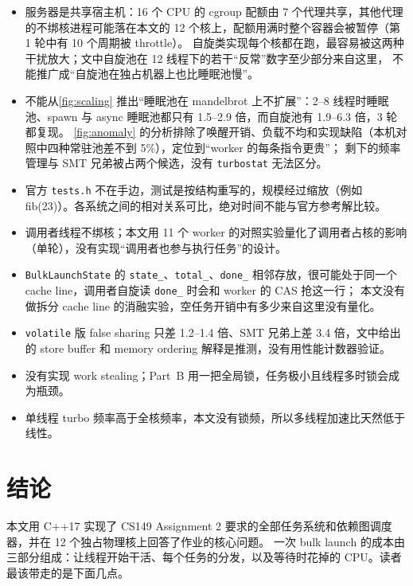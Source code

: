 \documentclass[11pt,a4paper]{ctexart}
\begin{document}
\begin{caveatbox}
\begin{itemize}
\item 服务器是共享宿主机：16 个 CPU 的 cgroup 配额由 7 个代理共享，其他代理的不绑核进程可能落在本文的 12 个核上，配额用满时整个容器会被暂停（第 1 轮中有 10 个周期被 throttle）。
自旋类实现每个核都在跑，最容易被这两种干扰放大；文中自旋池在 12 线程下的若干``反常''数字至少部分来自这里，
不能推广成``自旋池在独占机器上也比睡眠池慢''。
\item 不能从\cref{fig:scaling} 推出``睡眠池在 mandelbrot 上不扩展''：2--8 线程时睡眠池、spawn 与 async 睡眠池都只有 1.5--2.9 倍，而自旋池有 1.9--6.3 倍，3 轮都复现。
\cref{fig:anomaly} 的分析排除了唤醒开销、负载不均和实现缺陷（本机对照中四种常驻池差不到 5\%），定位到``worker 的每条指令更贵''；
剩下的频率管理与 SMT 兄弟被占两个候选，没有 \texttt{turbostat} 无法区分。
\item 官方 \texttt{tests.h} 不在手边，测试是按结构重写的，规模经过缩放（例如 fib(23)）。各系统之间的相对关系可比，绝对时间不能与官方参考解比较。
\item 调用者线程不绑核；本文用 11 个 worker 的对照实验量化了调用者占核的影响（单轮），没有实现``调用者也参与执行任务''的设计。
\item \texttt{BulkLaunchState} 的 \texttt{state\_\allowbreak{}}、\texttt{total\_\allowbreak{}}、\texttt{done\_\allowbreak{}} 相邻存放，很可能处于同一个 cache line，调用者自旋读 \texttt{done\_\allowbreak{}} 时会和 worker 的 CAS 抢这一行；
本文没有做拆分 cache line 的消融实验，空任务开销中有多少来自这里没有量化。
\item \texttt{volatile} 版 false sharing 只差 1.2--1.4 倍、SMT 兄弟上差 3.4 倍，文中给出的 store buffer 和 memory ordering 解释是推测，没有用性能计数器验证。
\item 没有实现 work stealing；Part~B 用一把全局锁，任务极小且线程多时锁会成为瓶颈。
\item 单线程 turbo 频率高于全核频率，本文没有锁频，所以多线程加速比天然低于线性。
\end{itemize}
\end{caveatbox}

\section{结论}

本文用 C++17 实现了 CS149 Assignment 2 要求的全部任务系统和依赖图调度器，并在 12 个独占物理核上回答了作业的核心问题。
一次 bulk launch 的成本由三部分组成：让线程开始干活、每个任务的分发，以及等待时花掉的 CPU。读者最该带走的是下面几点。
\end{document}
